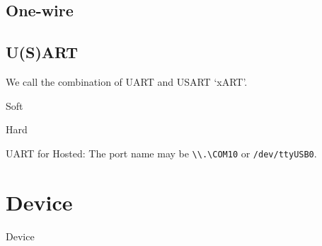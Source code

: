 \subsection{One-wire}

\subsection{U(S)ART}

We call the combination of UART and USART `xART'. 

Soft

Hard

UART for Hosted:
The port name may be \verb`\\.\COM10` or \verb`/dev/ttyUSB0`.

\section{Device}
{Device}
